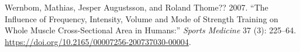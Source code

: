 \documentclass[
  letterpaper,
  DIV=11,
  numbers=noendperiod]{scrreprt}
\newlength{\cslhangindent}
\newenvironment{CSLReferences}[2] %
 {\begin{list}{}{%
  \setlength{\itemindent}{0pt}
  \setlength{\leftmargin}{0pt}
  \setlength{\parsep}{0pt}
  \ifodd #1
   \setlength{\leftmargin}{\cslhangindent}
   \setlength{\itemindent}{-1\cslhangindent}
  \fi
  \setlength{\itemsep}{#2\baselineskip}}}
 {\end{list}}
\begin{document}
\begin{CSLReferences}{1}{0}
Wernbom, Mathias, Jesper Augustsson, and Roland Thome?? 2007. {``The
Influence of Frequency, Intensity, Volume and Mode of Strength Training
on Whole Muscle Cross-Sectional Area in Humans:''} \emph{Sports
Medicine} 37 (3): 225--64.
\url{https://doi.org/10.2165/00007256-200737030-00004}.

\end{CSLReferences}
\end{document}
